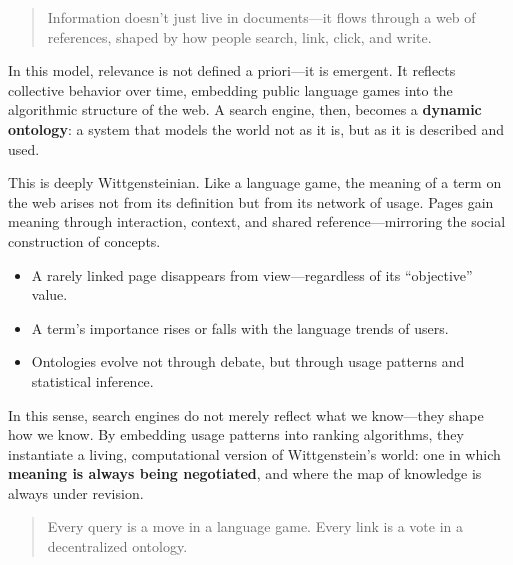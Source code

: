 \begin{quote}
Information doesn’t just live in documents—it flows through a web of references, shaped by how people search, link, click, and write.
\end{quote}

In this model, relevance is not defined a priori—it is emergent. It reflects collective behavior over time, embedding public language games into the algorithmic structure of the web. A search engine, then, becomes a \textbf{dynamic ontology}: a system that models the world not as it is, but as it is described and used.

This is deeply Wittgensteinian. Like a language game, the meaning of a term on the web arises not from its definition but from its network of usage. Pages gain meaning through interaction, context, and shared reference—mirroring the social construction of concepts.

\begin{itemize}
    \item A rarely linked page disappears from view—regardless of its “objective” value.
    \item A term’s importance rises or falls with the language trends of users.
    \item Ontologies evolve not through debate, but through usage patterns and statistical inference.
\end{itemize}

\medskip

\noindent
In this sense, search engines do not merely reflect what we know—they shape how we know. By embedding usage patterns into ranking algorithms, they instantiate a living, computational version of Wittgenstein’s world: one in which \textbf{meaning is always being negotiated}, and where the map of knowledge is always under revision.

\begin{quote}
Every query is a move in a language game. Every link is a vote in a decentralized ontology.
\end{quote}

